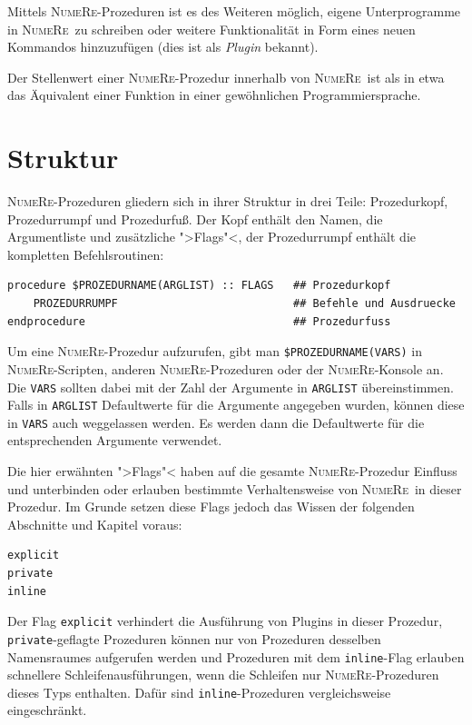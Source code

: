 \documentclass[DIV=14,headsepline,footsepline]{scrbook}
\newcommand{\NR}{\textsc{Nu\-me\-Re}}
\begin{document}
				Mittels \NR-Prozeduren ist es des Weiteren möglich, eigene Unterprogramme in \NR\ zu schreiben oder weitere Funktionalität in Form eines neuen Kommandos hinzuzufügen (dies ist als \emph{Plugin} bekannt).
				
				Der Stellenwert einer \NR-Prozedur innerhalb von \NR\ ist als in etwa das Äquivalent einer Funktion in einer gewöhnlichen Programmiersprache.
				
			\section{Struktur}
				\NR-Prozeduren gliedern sich in ihrer Struktur in drei Teile: Prozedurkopf, Prozedurrumpf und Prozedurfuß. Der Kopf enthält den Namen, die Argumentliste und zusätzliche ">Flags"<, der Prozedurrumpf enthält die kompletten Befehlsroutinen:
				\begin{lstlisting}
procedure $PROZEDURNAME(ARGLIST) :: FLAGS   ## Prozedurkopf
	PROZEDURRUMPF                           ## Befehle und Ausdruecke
endprocedure                                ## Prozedurfuss
				\end{lstlisting}
				Um eine \NR-Prozedur aufzurufen, gibt man \lstinline+$PROZEDURNAME(VARS)+ in \NR-Scrip\-ten, anderen \NR-Prozeduren oder der \NR-Konsole an. Die \lstinline+VARS+ sollten dabei mit der Zahl der Argumente in \lstinline+ARGLIST+ übereinstimmen. Falls in \lstinline+ARGLIST+ Defaultwerte für die Argumente angegeben wurden, können diese in \lstinline+VARS+ auch weggelassen werden. Es werden dann die Defaultwerte für die entsprechenden Argumente verwendet.
				
				Die hier erwähnten ">Flags"< haben auf die gesamte \NR-Prozedur Einfluss und unterbinden oder erlauben bestimmte Verhaltensweise von \NR\ in dieser Prozedur. Im Grunde setzen diese Flags jedoch das Wissen der folgenden Abschnitte und Kapitel voraus:
				\begin{lstlisting}
explicit
private
inline
				\end{lstlisting}
				Der Flag \lstinline+explicit+ verhindert die Ausführung von Plugins in dieser Prozedur, \lstinline+private+-geflagte Prozeduren können nur von Prozeduren desselben Namensraumes aufgerufen werden und Prozeduren mit dem \lstinline+inline+-Flag erlauben schnellere Schleifenausführungen, wenn die Schleifen nur \NR-Pro\-ze\-du\-ren dieses Typs enthalten. Dafür sind \lstinline+inline+-Pro\-ze\-du\-ren vergleichsweise eingeschränkt.
				
\end{document}
